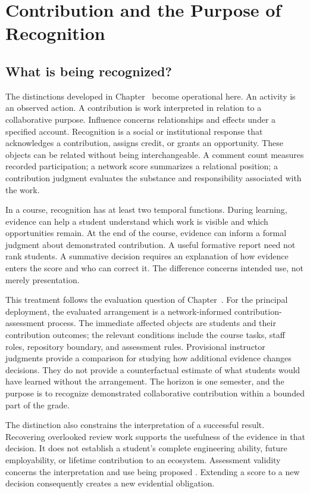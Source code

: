 \section{Contribution and the Purpose of Recognition}
\label{sec:ch7-purpose}

\subsection{What is being recognized?}
The distinctions developed in Chapter~ become operational here. An activity is an observed action. A contribution is work interpreted in relation to a collaborative purpose. Influence concerns relationships and effects under a specified account. Recognition is a social or institutional response that acknowledges a contribution, assigns credit, or grants an opportunity. These objects can be related without being interchangeable. A comment count measures recorded participation; a network score summarizes a relational position; a contribution judgment evaluates the substance and responsibility associated with the work.

In a course, recognition has at least two temporal functions. During learning, evidence can help a student understand which work is visible and which opportunities remain. At the end of the course, evidence can inform a formal judgment about demonstrated contribution. A useful formative report need not rank students. A summative decision requires an explanation of how evidence enters the score and who can correct it. The difference concerns intended use, not merely presentation.

This treatment follows the evaluation question of Chapter~. For the principal deployment, the evaluated arrangement is a network-informed contribution-assessment process. The immediate affected objects are students and their contribution outcomes; the relevant conditions include the course tasks, staff roles, repository boundary, and assessment rules. Provisional instructor judgments provide a comparison for studying how additional evidence changes decisions. They do not provide a counterfactual estimate of what students would have learned without the arrangement. The horizon is one semester, and the purpose is to recognize demonstrated collaborative contribution within a bounded part of the grade.

The distinction also constrains the interpretation of a successful result. Recovering overlooked review work supports the usefulness of the evidence in that decision. It does not establish a student's complete engineering ability, future employability, or lifetime contribution to an ecosystem. Assessment validity concerns the interpretation and use being proposed \citep{kane2013}. Extending a score to a new decision consequently creates a new evidential obligation.

